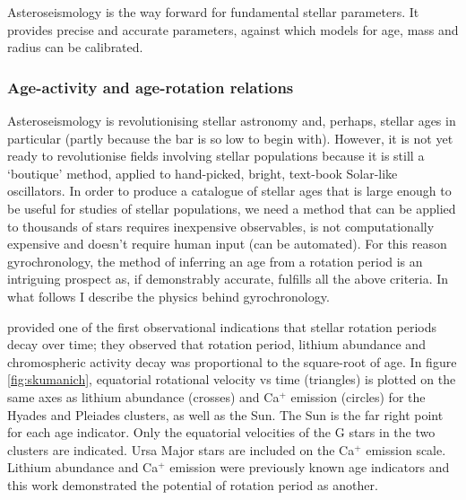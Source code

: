 Asteroseismology is the way forward for fundamental stellar parameters.
It provides precise and accurate parameters, against which models for age,
mass and radius can be calibrated.

\subsubsection*{Age-activity and age-rotation relations}

Asteroseismology is revolutionising stellar astronomy and, perhaps, stellar
ages in particular (partly because the bar is so low to begin with).
However, it is not yet ready to  revolutionise fields involving stellar
populations because it is still a `boutique' method, applied to hand-picked,
bright, text-book Solar-like oscillators.
In order to produce a catalogue of stellar ages that is large enough to be
useful for studies of stellar populations, we need a method that can be
applied to thousands of stars \ie requires inexpensive observables, is not
computationally expensive and doesn't require human input (can be automated).
For this reason gyrochronology, the method of inferring an age from a rotation
period is an intriguing prospect as, if demonstrably accurate, fulfills all
the above criteria.
In what follows I describe the physics behind gyrochronology.

\citet{Skumanich1972} provided one of the first observational indications that
stellar rotation periods decay over time; they observed that rotation period,
lithium abundance and chromospheric activity decay was proportional to the
square-root of age.
In figure \ref{fig:skumanich}, equatorial rotational velocity vs time
(triangles) is plotted on the same axes as lithium abundance (crosses) and
Ca$^+$ emission (circles) for the Hyades and Pleiades clusters, as well as the
Sun.
The Sun is the far right point for each age indicator.
Only the equatorial velocities of the G stars in the two clusters are
indicated.
Ursa Major stars are included on the Ca$^+$ emission scale.
Lithium abundance and Ca$^+$ emission were previously known age indicators and
this work demonstrated the potential of rotation period as another.

